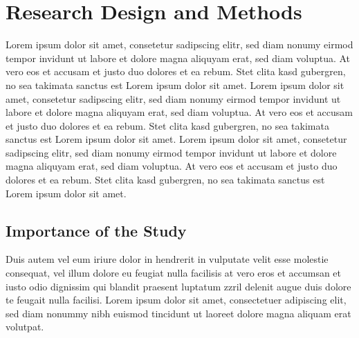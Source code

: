 \chapter{Research Design and Methods}
Lorem ipsum dolor sit amet, consetetur sadipscing elitr,  sed diam nonumy eirmod
tempor invidunt ut labore et dolore magna aliquyam erat, sed diam voluptua. At
vero eos et accusam et justo duo dolores et ea rebum. Stet clita kasd gubergren,
no sea takimata sanctus est Lorem ipsum dolor sit amet. Lorem ipsum dolor sit
amet, consetetur sadipscing elitr,  sed diam nonumy eirmod tempor invidunt ut
labore et dolore magna aliquyam erat, sed diam voluptua. At vero eos et accusam
et justo duo dolores et ea rebum. Stet clita kasd gubergren, no sea takimata
sanctus est Lorem ipsum dolor sit amet. Lorem ipsum dolor sit amet, consetetur
sadipscing elitr,  sed diam nonumy eirmod tempor invidunt ut labore et dolore
magna aliquyam erat, sed diam voluptua. At vero eos et accusam et justo duo
dolores et ea rebum. Stet clita kasd gubergren, no sea takimata sanctus est
Lorem ipsum dolor sit amet.

\section{Importance of the Study}
Duis autem vel eum iriure dolor in hendrerit in vulputate velit esse molestie
consequat, vel illum dolore eu feugiat nulla facilisis at vero eros et accumsan
et iusto odio dignissim qui blandit praesent luptatum zzril delenit augue duis
dolore te feugait nulla facilisi. Lorem ipsum dolor sit amet, consectetuer
adipiscing elit, sed diam nonummy nibh euismod tincidunt ut laoreet dolore
magna aliquam erat volutpat.


